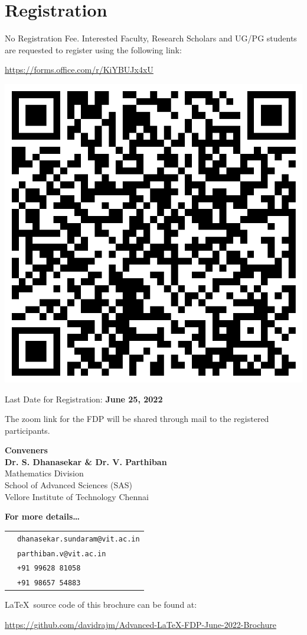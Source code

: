 \section{Registration}
No Registration Fee.
Interested Faculty, Research Scholars and UG/PG students are requested to register using the following link:
\begin{center}
	\textcolor{Maroon}{
		\large 
		\url{https://forms.office.com/r/KiYBUJx4xU}
	}
	

	\includegraphics[width=.25\textwidth]{img/qr}
\end{center}



Last Date for Registration: \textcolor{primaryColor}{\large \textbf{June 25, 2022}}

The zoom link for the FDP will be shared through mail to the registered participants.

\begin{center}
	\textcolor{primaryColor}{\Large \textbf{Conveners}}\\[.5\baselineskip]
	\textbf{\textcolor{secondaryColor}{Dr. S. Dhanasekar \& Dr. V. Parthiban}}\\
	Mathematics Division\\
	School of Advanced Sciences (SAS)\\
	Vellore Institute of Technology Chennai
\end{center}

\begin{snugshade}
\vspace{0.5\baselineskip}
		\begin{center}
\textcolor{primaryColor}{\Large \textbf{For more details\dots}}\\[.5\baselineskip]
		\begin{tabular}{cp{}}
			\textcolor{primaryColor}{\faEnvelope} & \texttt{dhanasekar.sundaram@vit.ac.in} \\
			& \texttt{parthiban.v@vit.ac.in} \\
			\textcolor{primaryColor}{\faPhone} & \texttt{+91 99628 81058}\\
			& \texttt{+91 98657 54883}
		\end{tabular}
	\end{center}
\end{snugshade}

\vfill

\begin{footnotesize}
\LaTeX\ source code of this brochure can be found at:

\url{https://github.com/davidrajm/Advanced-LaTeX-FDP-June-2022-Brochure}
\end{footnotesize}



